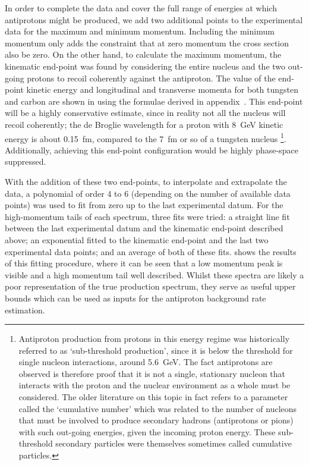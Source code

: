 \FigAntiprotonEndpoint
In order to complete the data and cover the full range of energies at which antiprotons might be produced, we add two additional points to the experimental data for the maximum and minimum momentum.
Including the minimum momentum only adds the constraint that at zero momentum the cross section also be zero.
On the other hand, to calculate the maximum momentum, the kinematic end-point was found by considering the entire nucleus and the two out-going protons to recoil coherently against the antiproton.
The value of the end-point kinetic energy and longitudinal and transverse momenta for both tungsten and carbon are shown in  using the formulae derived in appendix~.
This end-point will be a highly conservative estimate, since in reality not all the nucleus will recoil coherently;  the de Broglie wavelength for a proton with 8~GeV kinetic energy is about 0.15~fm, compared to the 7~fm or so of a tungsten nucleus%
\footnote{Antiproton production from protons in this energy regime was historically referred to as `sub-threshold production', since it is below the threshold for single nucleon interactions, around 5.6~GeV.
The fact antiprotons are observed is therefore proof that it is not a single, stationary nucleon that interacts with the proton and the nuclear environment as a whole must be considered.
  The older literature on this topic in fact refers to a parameter called the `cumulative number' which was related to the number of nucleons that must be involved to produce secondary hadrons (\eg antiprotons or pions) with such out-going energies, given the incoming proton energy.  
These sub-threshold secondary particles were themselves sometimes called cumulative particles.}.
Additionally, achieving this end-point configuration would be highly phase-space suppressed.

\FigAntiprotonFits
With the addition of these two end-points, to interpolate and extrapolate the data, a polynomial of order 4 to 6 (depending on the number of available data points) was used to fit from zero up to the last experimental datum.
For the high-momentum tails of each spectrum, three fits were tried: a straight line fit between the last experimental datum and the kinematic end-point described above; an exponential fitted to the kinematic end-point and the last two experimental data points; and an average of both of these fits.
 shows the results of this fitting procedure, where it can be seen that a low momentum peak is visible and a high momentum tail well described.
Whilst these spectra are likely a poor representation of the true production spectrum, they serve as useful upper bounds which can be used as inputs for the antiproton background rate estimation.


